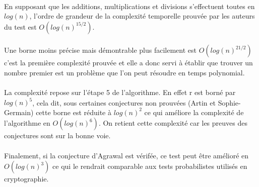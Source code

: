 		\paragraph{}En supposant que les additions, multiplications et divisions s'effectuent toutes en $log(n)$, l'ordre de grandeur de la complexité temporelle prouvée par les auteurs du test est $O(log(n)^{15/2})$.
		\paragraph{}Une borne moins précise mais démontrable plus facilement est $O(log(n)^{21/2})$ c'est la première complexité prouvée et elle a donc servi à établir que trouver un nombre premier est un problème que l'on peut résoudre en temps polynomial.
		\paragraph{}La complexité repose sur l'étape 5 de l'algorithme. En effet r est borné par $log(n)^{5}$, cela dit, sous certaines conjectures non prouvées (Artin et Sophie-Germain) cette borne est réduite à $log(n)^2$ ce qui améliore la complexité de l'algorithme en $O(log(n)^6)$. On retient cette complexité car les preuves des conjectures sont sur la bonne voie.
		\paragraph{}Finalement, si la conjecture d'Agrawal est vérifée, ce test peut être amélioré en $O(log(n)^{3})$ ce qui le rendrait comparable aux tests probabilistes utilisés en cryptographie. 
